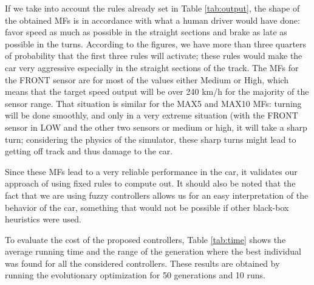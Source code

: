 \documentclass[10pt,journal,compsoc]{IEEEtran}
\begin{document}
%
If we take into account the rules already set in Table
\ref{tab:output}, the shape of the obtained MFs  is in accordance with
what a human driver would have done: favor speed as much as possible
in the straight sections and brake as late as possible in the turns. 
According to the figures, we have more than three quarters of
probability that the first three rules will activate; these rules
would make the car very aggressive especially in the straight sections
of the track. The MFs for the FRONT sensor are for most of the values
either Medium or High, which means that the target speed output will
be over 240 km/h for the majority of the sensor range. 
That situation is similar for the MAX5 and MAX10 MFs: turning will be done smoothly, and only in a very extreme situation (with the FRONT sensor in LOW and
the other two sensors or medium or high, it will take a sharp turn;
considering the physics of the simulator, these sharp turns might lead
to getting off track and thus damage to the car.

Since these MFs lead to a very reliable performance in the car, it
validates our approach of using fixed rules to compute out. It should
also be noted that the fact that we are using fuzzy controllers allows
us for an easy interpretation of the behavior of the car, something
that would not be possible if other black-box heuristics were used.


To evaluate the cost of the proposed controllers, Table \ref{tab:time} shows the average running time and the range of the generation where the best individual was found for all the considered controllers. These results are obtained by running the evolutionary optimization for 50 generations and 10 runs.  
\end{document}
